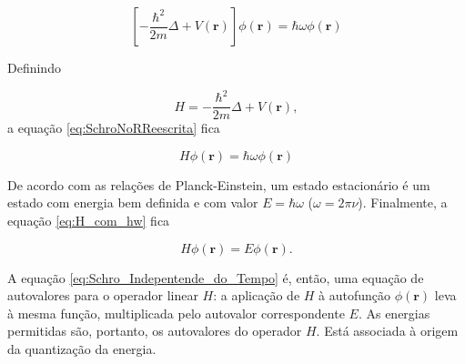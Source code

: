 	\begin{equation}\label{eq:SchroNoRReescrita}
			\left[-\frac{\hbar^2}{2m}\Delta + V(\textbf{r})\right] \phi(\textbf{r}) = \hbar \omega \phi(\textbf{r})
	\end{equation}
	
	Definindo 
	
	\begin{equation}
	H  = -\frac{\hbar^2}{2m}\Delta + V(\textbf{r}),
	\end{equation}
	a equação \ref{eq:SchroNoRReescrita} fica
	
	\begin{equation}\label{eq:H_com_hw}
		H\phi(\textbf{r}) = \hbar \omega \phi(\textbf{r})
	\end{equation}
	
	De acordo com as relações de Planck-Einstein, um estado estacionário é um estado com energia bem definida e com valor $E = \hbar \omega$ ($\omega = 2 \pi \nu$). Finalmente, a equação \ref{eq:H_com_hw} fica
	
	\begin{equation}\label{eq:Schro_Indepentende_do_Tempo}
		H\phi(\textbf{r}) = E \phi(\textbf{r}).
	\end{equation}
	
	A equação \ref{eq:Schro_Indepentende_do_Tempo} é, então, uma equação de autovalores para o operador linear $H$: a aplicação de $H$ à autofunção $\phi(\textbf{r})$ leva à mesma função, multiplicada pelo autovalor correspondente $E$. As energias permitidas são, portanto, os autovalores do operador $H$. Está associada à origem da quantização da energia.
	
	